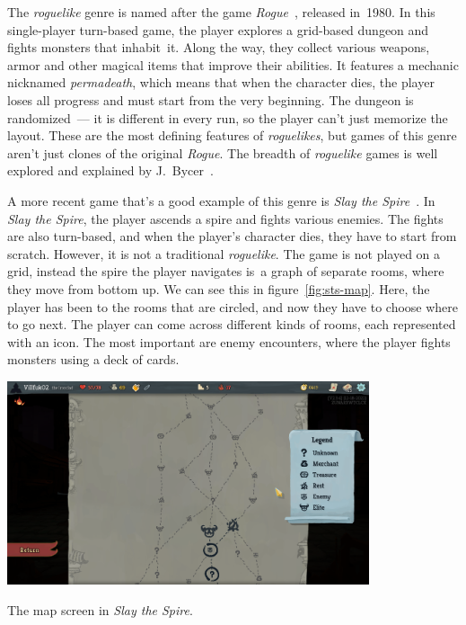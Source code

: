 The \emph{roguelike} genre is named after the game \emph{Rogue}~\cite{RogueWiki}, released in~1980.
In this single-player turn-based game, the player explores a grid-based dungeon and fights monsters that inhabit~it.
Along the way, they collect various weapons, armor and other magical items that improve their abilities.
It features a mechanic nicknamed \emph{permadeath}, which means that when the character dies, the player loses all progress and must start from the very beginning.
The dungeon is randomized~--- it is different in every run, so the player can't just memorize the layout.
These are the most defining features of \emph{roguelikes}, but games of this genre aren't just clones of the original \emph{Rogue}.
The breadth of \emph{roguelike} games is well explored and explained by J.~Bycer~\cite{roguelikeBycer}.

A more recent game that's a good example of this genre is \emph{Slay the Spire}~\cite{StSWiki}.
In \emph{Slay the Spire}, the player ascends a spire and fights various enemies.
The fights are also turn-based, and when the player's character dies, they have to start from scratch.
However, it is not a traditional \emph{roguelike}.
The game is not played on a grid, instead the spire the player navigates is~a graph of separate rooms, where they move from bottom up.
We can see this in figure~\ref{fig:sts-map}.
Here, the player has been to the rooms that are circled, and now they have to choose where to go next.
The player can come across different kinds of rooms, each represented with an icon.
The most important are enemy encounters, where the player fights monsters using a deck of cards.

\begin{center}
    \captionsetup{type=figure}
    \includegraphics[width=0.8\textwidth]{img/Slay-the-Spire-Map.png}
    \caption{The map screen in \emph{Slay the Spire}.}
    \label{fig:sts-map}
\end{center}

